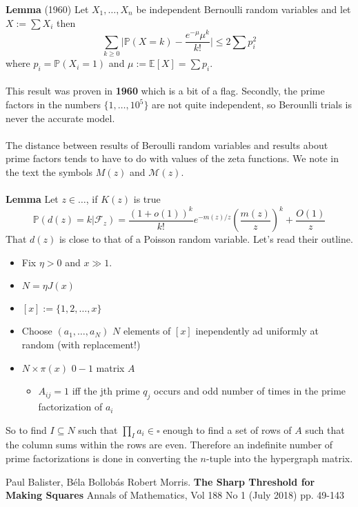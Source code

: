 \documentclass[12pt]{article}
\begin{document}
{\textbf{Lemma} (1960) Let $X_1, \dots, X_n$ be independent Bernoulli random variables and let $X:= \sum X_i$ then 
$$ \sum_{k \geq 0} \Big| \mathbb{P}(X=k) - \frac{e^{-\mu} \mu^k}{k!} \Big| \leq 2 \sum p_i^2 $$
where $p_i = \mathbb{P}(X_i = 1)$ and $\mu := \mathbb{E}[X] = \sum p_i$.   \\ \\
This result was proven in {\color{red!90!white} \textbf{1960}} which is a bit of a flag.  Secondly, the prime factors in the numbers $\{ 1, \dots, 10^5\}$ are not quite independent, so Berounlli trials is never the accurate model.  \\ \\
The distance between results of Beroulli random variables and results about prime factors tends to have to do with values of the zeta functions.  We note in the text the symbols $M(z)$ and $\mathcal{M}(z)$.  \\ \\ 
\textbf{Lemma} Let $z \in \dots$, if $K(z)$ is true
$$ \mathbb{P}(d(z) = k | \mathcal{F}_z) = \frac{(1 + o(1))^k}{k!} e^{-m(z)/z} \left( \frac{m(z)}{z} \right)^k + \frac{O(1)}{z} $$
That $d(z)$ is close to that of a Poisson random variable. Let's read their outline.
\begin{itemize}
	\item Fix $\eta > 0$ and $x \gg 1$.
	\item $N = \eta J(x)$ 
	\item $[x] := \{ 1, 2, \dots, x\} $
	\item Choose $(a_1, \dots, a_N)$ $N$ elements of $[x]$ inependently ad uniformly at random (with replacement!)
	\item $N \times \pi(x)$ $0-1$ matrix $A$
	\begin{itemize}
		\item $A_{ij}=1$ iff the jth prime $q_j$ occurs and odd number of times in the prime factorization of $a_i$
	\end{itemize}
\end{itemize}
So to find $I \subseteq {N}$ such that 
$\prod_I a_i \in \square$ 
enough to find a set of rows of $A$ such that the column sums within the rows are even.  Therefore an indefinite number of prime factorizations is done in converting the $n$-tuple into the hypergraph matrix.
\noindent 
 
}
\vfill

\begin{thebibliography}{}

\item Paul Balister, B\'{e}la Bollob\'{a}s Robert Morris. \textbf{The Sharp Threshold for Making Squares} 
Annals of Mathematics, Vol 188 No 1 (July 2018) pp. 49-143
\end{thebibliography}
\end{document}
